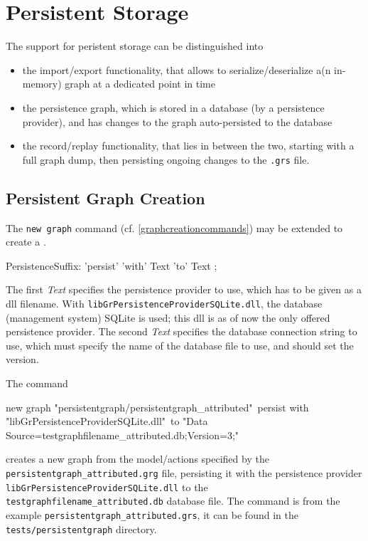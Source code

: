 \chapter{Persistent Storage}
\label{cha:persistentstorage}

The support for peristent storage can be distinguished into
\begin{itemize}
	\item the import/export functionality, that allows to serialize/deserialize a(n in-memory) graph at a dedicated point in time
	\item the persistence graph, which is stored in a database (by a persistence provider), and has changes to the graph auto-persisted to the database
	\item the record/replay functionality, that lies in between the two, starting with a full graph dump, then persisting ongoing changes to the \texttt{.grs} file.
\end{itemize}


\section{Persistent Graph Creation}
\label{persistentgraphcreationcommands}

The \texttt{new graph} command (cf. \ref{graphcreationcommands}) may be extended to create a .

\begin{rail}
  PersistenceSuffix: 'persist' 'with' Text 'to' Text ;
\end{rail}
The first \emph{Text} specifies the persistence provider to use, which has to be given as a dll filename.
With \texttt{libGrPersistenceProviderSQLite.dll}, the database (management system) SQLite is used; this dll is as of now the only offered persistence provider.
The second \emph{Text} specifies the database connection string to use, which must specify the name of the database file to use, and should set the version.

\begin{example}
The command
\begin{grshelllet}
new graph "persistentgraph/persistentgraph_attributed"\
persist with "libGrPersistenceProviderSQLite.dll"\
to "Data Source=testgraphfilename_attributed.db;Version=3;"
\end{grshelllet}
creates a new graph from the model/actions specified by the \texttt{persistentgraph\_attributed.grg} file, persisting it with the persistence provider \texttt{libGrPersistenceProviderSQLite.dll} to the \texttt{testgraphfilename\_attributed.db} database file.
The command is from the example \texttt{persistentgraph\_attributed.grs}, it can be found in the \texttt{tests/persistentgraph} directory.
\end{example}

